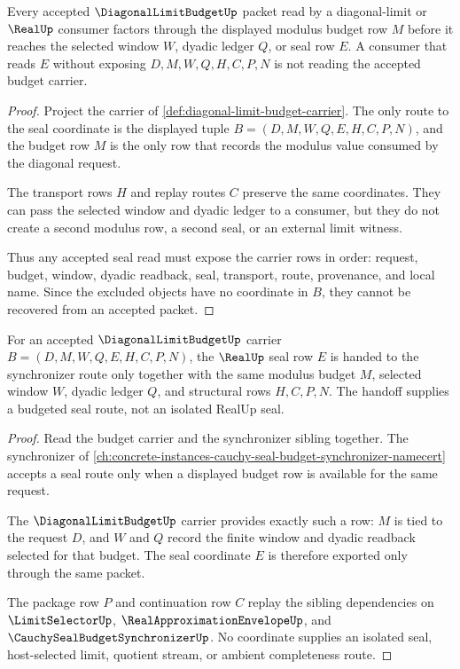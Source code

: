\begin{theorem}
\label{thm:diagonal-limit-budget-nonescape}
Every accepted $\DiagonalLimitBudgetUp$ packet read by a diagonal-limit or $\RealUp$ consumer factors through the displayed modulus budget row $M$ before it reaches the selected window $W$, dyadic ledger $Q$, or seal row $E$. A consumer that reads $E$ without exposing $D,M,W,Q,H,C,P,N$ is not reading the accepted budget carrier.
\end{theorem}
\begin{proof}
Project the carrier of \autoref{def:diagonal-limit-budget-carrier}. The only route to the seal coordinate is the displayed tuple $B=(D,M,W,Q,E,H,C,P,N)$, and the budget row $M$ is the only row that records the modulus value consumed by the diagonal request.

The transport rows $H$ and replay routes $C$ preserve the same coordinates. They can pass the selected window and dyadic ledger to a consumer, but they do not create a second modulus row, a second seal, or an external limit witness.

Thus any accepted seal read must expose the carrier rows in order: request, budget, window, dyadic readback, seal, transport, route, provenance, and local name. Since the excluded objects have no coordinate in $B$, they cannot be recovered from an accepted packet.
\end{proof}

\begin{theorem}
\label{thm:diagonal-limit-budget-seal-handoff}
For an accepted $\DiagonalLimitBudgetUp$ carrier $B=(D,M,W,Q,E,H,C,P,N)$, the $\RealUp$ seal row $E$ is handed to the synchronizer route only together with the same modulus budget $M$, selected window $W$, dyadic ledger $Q$, and structural rows $H,C,P,N$. The handoff supplies a budgeted seal route, not an isolated RealUp seal.
\end{theorem}
\begin{proof}
Read the budget carrier and the synchronizer sibling together. The synchronizer of \autoref{ch:concrete-instances-cauchy-seal-budget-synchronizer-namecert} accepts a seal route only when a displayed budget row is available for the same request.

The $\DiagonalLimitBudgetUp$ carrier provides exactly such a row: $M$ is tied to the request $D$, and $W$ and $Q$ record the finite window and dyadic readback selected for that budget. The seal coordinate $E$ is therefore exported only through the same packet.

The package row $P$ and continuation row $C$ replay the sibling dependencies on $\LimitSelectorUp$, $\RealApproximationEnvelopeUp$, and $\CauchySealBudgetSynchronizerUp$. No coordinate supplies an isolated seal, host-selected limit, quotient stream, or ambient completeness route.
\end{proof}

